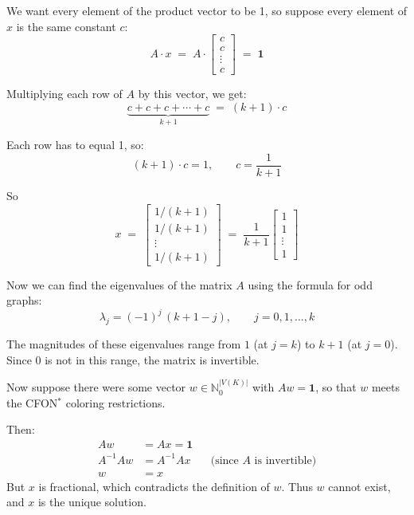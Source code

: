 \documentclass[11pt]{article}
\begin{document}
We want every element of the product vector to be 1, so suppose every element
of $x$ is the same constant $c$:
\[
  A \cdot x \;=\; A \cdot
  \begin{bmatrix} c \\ c \\ \vdots \\ c \end{bmatrix}
  \;=\; \mathbf{1}
\]

Multiplying each row of $A$ by this vector, we get:
\[
  \underbrace{c + c + c + \cdots + c}_{k+1} \;=\; (k+1) \cdot c
\]

Each row has to equal 1, so:
\[
  (k+1) \cdot c = 1, \qquad c = \frac{1}{k+1}
\]

So
\[
  x \;=\;
  \begin{bmatrix} 1/(k+1) \\ 1/(k+1) \\ \vdots \\ 1/(k+1) \end{bmatrix}
  \;=\; \frac{1}{k+1}
  \begin{bmatrix} 1 \\ 1 \\ \vdots \\ 1 \end{bmatrix}
\]

Now we can find the eigenvalues of the matrix $A$ using the formula for odd
graphs:
\[
  \lambda_j = (-1)^j\,(k+1-j), \qquad j = 0, 1, \dots, k
\]

The magnitudes of these eigenvalues range from $1$ (at $j = k$) to $k+1$ (at
$j = 0$). Since $0$ is not in this range, the matrix is invertible.

Now suppose there were some vector $w \in \mathbb{N}_0^{|V(K)|}$ with
$Aw = \mathbf{1}$, so that $w$ meets the CFON$^{*}$ coloring restrictions.

Then:
\begin{align*}
  Aw &= Ax = \mathbf{1} \\
  A^{-1}Aw &= A^{-1}Ax && \text{(since $A$ is invertible)} \\
  w &= x
\end{align*}
But $x$ is fractional, which contradicts the definition of $w$. Thus $w$
cannot exist, and $x$ is the unique solution.
\end{document}
